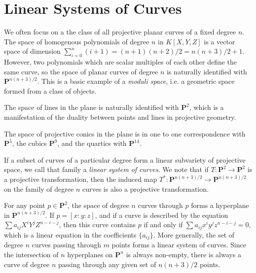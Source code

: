 \section{Linear Systems of Curves}

We often focus on a the class of all projective planar curves of a fixed degree $n$. The space of homogenous polynomials of degree $n$ in $K[X,Y,Z]$ is a vector space of dimension $\sum_{i = 0}^n (i+1) = (n+1)(n+2)/2 = n(n+3)/2 + 1$. However, two polynomials which are scalar multiples of each other define the same curve, so the space of planar curves of degree $n$ is naturally identified with $\mathbf{P}^{n(n+3)/2}$. This is a basic example of a \emph{moduli space}, i.e. a geometric space formed from a class of objects.

\begin{example}
    The space of lines in the plane is naturally identified with $\mathbf{P}^2$, which is a manifestation of the duality between points and lines in projective geometry.
\end{example}

\begin{example}
    The space of projective conics in the plane is in one to one correspondence with $\mathbf{P}^5$, the cubics $\mathbf{P}^9$, and the quartics with $\mathbf{P}^{14}$.
\end{example}

If a subset of curves of a particular degree form a linear subvariety of projective space, we call that family a \emph{linear system of curves}. We note that if $T: \mathbf{P}^2 \to \mathbf{P}^2$ is a projective transformation, then the induced map $T^*: \mathbf{P}^{n(n+3)/2} \to \mathbf{P}^{n(n+3)/2}$ on the family of degree $n$ curves is also a projective transformation.

\begin{example}
    For any point $p \in \mathbf{P}^2$, the space of degree $n$ curves through $p$ forms a hyperplane in $\mathbf{P}^{n(n+3)/2}$. If $p = [x:y:z]$, and if a curve is described by the equation $\sum a_{ij} X^i Y^j Z^{n-i-j}$, then this curve contains $p$ if and only if $\sum a_{ij} x^iy^jz^{n-i-j} = 0$, which is a linear equation in the coefficients $\{ a_{ij} \}$. More generally, the set of degree $n$ curves passing through $m$ points forms a linear system of curves. Since the intersection of $n$ hyperplanes on $\mathbf{P}^n$ is always non-empty, there is always a curve of degree $n$ passing through any given set of $n(n+3)/2$ points.
\end{example}

